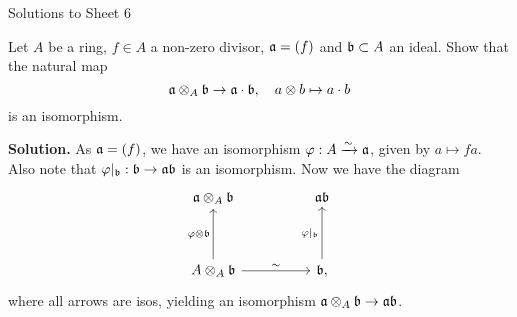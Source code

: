 \documentclass[a4paper,11pt]{article}
\begin{document}
\begin{center}
    \huge{Solutions to Sheet 6}
\end{center}

Let $A$ be a ring, $f \in A$ a non-zero divisor, $\mathfrak{a} = (f)$ and $\mathfrak{b} \subset A$
an ideal. Show that the natural map
\begin{equation*}
    \mathfrak{a} \otimes_A \mathfrak{b} \to \mathfrak{a} \cdot \mathfrak{b}, \quad a \otimes b \mapsto a\cdot b
\end{equation*}
is an isomorphism.

\textbf{Solution.} 
As $\mathfrak{a} = (f)$, we have an isomorphism $\varphi: A \xrightarrow{\sim} \mathfrak{a}$, given by 
$a \mapsto fa$. Also note that $\varphi|_{\mathfrak{b}}: \mathfrak{b} \to \mathfrak{a} \mathfrak{b}$ is an isomorphism.
Now we have the diagram
\[\begin{tikzcd}[ampersand replacement=\&]
	{\fa \otimes_A \fb} \&\& {\fa \fb} \\
	\\
	{A \otimes_A \fb} \&\& \fb
	\arrow["\sim", from=3-1, to=3-3]
	\arrow["{\phi|_\fb}", from=3-3, to=1-3]
	\arrow["{\phi \otimes \fb}", from=3-1, to=1-1],
\end{tikzcd}\]
where all arrows are isos, yielding an isomorphism $\mathfrak{a} \otimes_A \mathfrak{b} \to \mathfrak{a} \mathfrak{b}$. 
\end{document}

